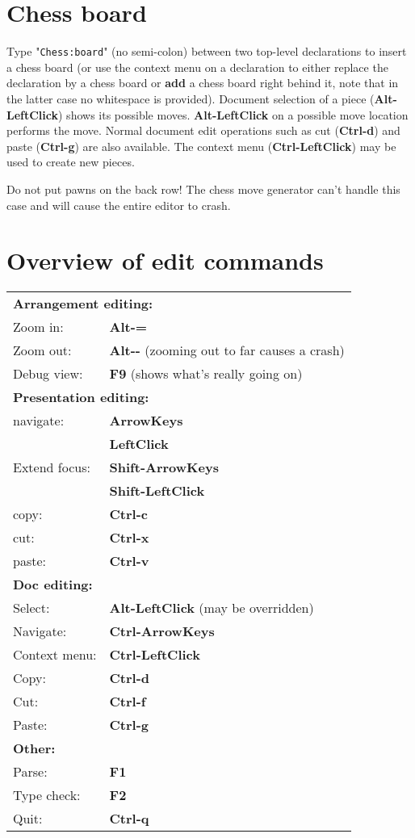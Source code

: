 \documentclass{article}
\begin{document}
\section{Chess board}
Type "\verb|Chess:|\textvisiblespace \verb|board|" (no semi-colon) between two top-level declarations to insert a chess board (or use the context menu on a declaration to either replace the declaration by a chess board or {\bf add} a chess board right behind it, note that in the latter case no whitespace is provided). Document selection of a piece ({\bf Alt-LeftClick}) shows its possible moves. {\bf Alt-LeftClick} on a possible move location performs the move. Normal document edit operations such as cut ({\bf Ctrl-d}) and paste ({\bf Ctrl-g}) are also available. The context menu ({\bf Ctrl-LeftClick}) may be used to create new pieces.

\bigskip 
{} Do not put pawns on the back row! The chess move generator can't handle this case and will cause the entire editor to crash.

\section{Overview of edit commands}

\begin{tabular}[t]{ll} 
\multicolumn{2}{l}{\bf Arrangement editing:}\\
Zoom in:    &  {\bf Alt-=}\\
Zoom out:   &  {\bf Alt-{-}}  (zooming out to far causes a crash)\\
Debug view: & {\bf F9}   (shows what's really going on)\\
\hline

\multicolumn{2}{l}{\bf Presentation editing:}\\
navigate:    & {\bf ArrowKeys}\\
             & {\bf LeftClick}\\        
Extend focus:& {\bf Shift-ArrowKeys}\\
            & {\bf  Shift-LeftClick}\\
copy:       & {\bf Ctrl-c}\\
cut:        & {\bf Ctrl-x}\\
paste:      & {\bf  Ctrl-v}\\
\hline

\multicolumn{2}{l}{\bf Doc editing:}\\
Select:      & {\bf Alt-LeftClick} (may be overridden)\\
Navigate:    & {\bf Ctrl-ArrowKeys}\\
Context menu:& {\bf Ctrl-LeftClick}\\
Copy:        & {\bf Ctrl-d}\\
Cut:         & {\bf Ctrl-f}\\
Paste:       & {\bf Ctrl-g}\\
\hline
\multicolumn{2}{l}{\bf Other:}\\
Parse:      & {\bf F1}\\
Type check: & {\bf F2}\\
Quit:       & {\bf Ctrl-q}\\
\end{tabular}
\end{document}
